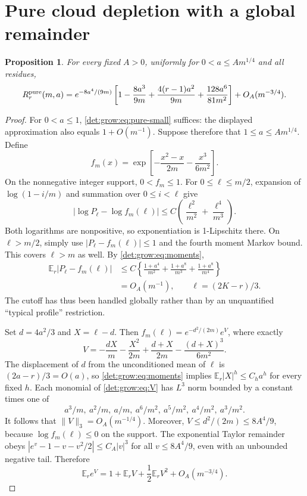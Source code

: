 \documentclass[11pt,letterpaper]{article}
\numberwithin{equation}{section}
\newtheorem{proposition}[theorem]{Proposition}
\theoremstyle{definition}\newtheorem{definition}[theorem]{Definition}
\theoremstyle{remark}\newtheorem{remark}[theorem]{Remark}
\newcommand{\E}{\mathbb E}
\begin{document}
\section{Pure cloud depletion with a global remainder}\label{det:grow:sec:pure}
\begin{proposition}\label{det:grow:prop:pure}
For every fixed $A>0$, uniformly for $0<a\le A m^{1/4}$ and all residues,
\begin{equation}\label{det:grow:eq:pure}
 R_r^{\rm pure}(m,a)
 =e^{-8a^4/(9m)}\left[1-\frac{8a^3}{9m}
 +\frac{4(r-1)a^2}{9m}+\frac{128a^6}{81m^2}\right]
 +O_A(m^{-3/4}).
\end{equation}
\end{proposition}
\begin{proof}
For $0<a\le1$, \eqref{det:grow:eq:pure-small} suffices: the displayed
approximation also equals $1+O(m^{-1})$. Suppose therefore that
$1\le a\le A m^{1/4}$. Define
\[
 f_m(x)=\exp\left[-\frac{x^2-x}{2m}-\frac{x^3}{6m^2}\right].
\]
On the nonnegative integer support, $0<f_m\le1$. For $0\le\ell\le m/2$,
expansion of $\log(1-i/m)$ and summation over $0\le i<\ell$ give
\begin{equation}\label{det:grow:eq:logPbound}
 |\log P_\ell-\log f_m(\ell)|
 \le C\left(\frac{\ell^2}{m^2}+\frac{\ell^4}{m^3}\right).
\end{equation}
Both logarithms are nonpositive, so exponentiation is 1-Lipschitz there.
On $\ell>m/2$, simply use $|P_\ell-f_m(\ell)|\le1$ and the fourth
moment Markov bound. This covers $\ell>m$ as well. By
\eqref{det:grow:eq:moments},
\begin{equation}\label{det:grow:eq:globalPaverage}
\begin{aligned}
 \E_r|P_\ell-f_m(\ell)|
 &\le C\left\{\frac{1+a^4}{m^2}+\frac{1+a^8}{m^3}
                  +\frac{1+a^8}{m^4}\right\}\\
 &=O_A(m^{-1}),\qquad \ell=(2K-r)/3.
\end{aligned}
\end{equation}
The cutoff has thus been handled globally rather than by an unquantified
``typical profile'' restriction.

Set $d=4a^2/3$ and $X=\ell-d$. Then
$f_m(\ell)=e^{-d^2/(2m)}e^V$, where exactly
\begin{equation}\label{det:grow:eq:V}
 V=-\frac{dX}{m}-\frac{X^2}{2m}+\frac{d+X}{2m}
                  -\frac{(d+X)^3}{6m^2}.
\end{equation}
The displacement of $d$ from the unconditioned mean of $\ell$ is
$(2a-r)/3=O(a)$, so \eqref{det:grow:eq:moments} implies
$\E_r|X|^h\le C_h a^h$ for every fixed $h$. Each monomial of
\eqref{det:grow:eq:V} has $L^3$ norm bounded by a constant times one of
\[
 a^3/m,\ a^2/m,\ a/m,\ a^6/m^2,\ a^5/m^2,\ a^4/m^2,\ a^3/m^2.
\]
It follows that $\|V\|_3=O_A(m^{-1/4})$. Moreover,
$V\le d^2/(2m)\le8A^4/9$, because $\log f_m(\ell)\le0$ on the support.
The exponential Taylor remainder obeys
$|e^v-1-v-v^2/2|\le C_A|v|^3$ for all $v\le8A^4/9$, even with an
unbounded negative tail. Therefore
\begin{equation}\label{det:grow:eq:Etaylor}
 \E_r e^V=1+\E_rV+\frac12\E_r V^2+O_A(m^{-3/4}).
\end{equation}


\end{proof}
\end{document}
